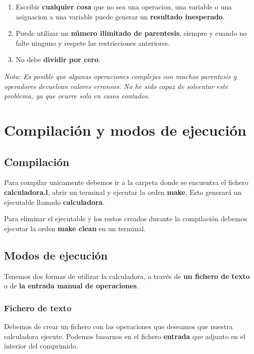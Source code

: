\documentclass[12pt]{article}
\begin{document}
\begin{enumerate}
    \item Escribir \textbf{cualquier cosa} que no sea una operacion, una variable o una asignacion
    a una variable puede generar un \textbf{resultado inesperado}.\newline

    \item Puede utilizar un \textbf{número ilimitado de parentesis}, siempre y cuando no falte ninguno y respete 
    las restricciones anteriores.\newline

    \item No debe \textbf{dividir por cero}.\newline
\end{enumerate}

\textit{Nota: Es posible que algunas operaciones complejas con muchos parentesis y operadores devuelvan valores erroneos. 
No he sido capaz de solventar este problema, ya que ocurre solo en casos contados.}

\section{Compilación y modos de ejecución}
\subsection{Compilación}
Para compilar unicamente debemos ir a la carpeta donde se encuentra el fichero \textbf{calculadora.l}, abrir un terminal y ejecutar la orden \textbf{make}.
Esto generará un ejecutable llamado \textbf{calculadora}.

Para eliminar el ejecutable y los restos creados durante la compilación debemos ejecutar la orden \textbf{make clean} en un terminal.

\noindent{}%

\subsection{Modos de ejecución}
Tenemos dos formas de utilizar la calculadora, a través de \textbf{un fichero de texto} o de \textbf{la entrada manual de operaciones}.
\subsubsection{Fichero de texto}
Debemos de crear un fichero con las operaciones que deseamos que nuestra calculadora ejecute. Podemos basarnos en el fichero \textbf{entrada} que adjunto en el
interior del comprimido.
\end{document}
